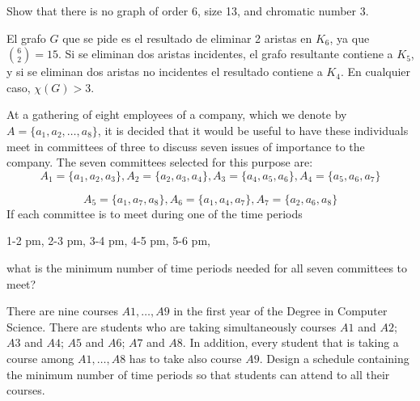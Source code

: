 \documentclass[twoside]{article}
\begin{document}
\newpage

\begin{ejercicio}{3.3}
 Show that there is no graph of order 6, size 13, and chromatic number 3.
\end{ejercicio}
\begin{solucion}
El grafo $G$ que se pide es el resultado de eliminar 2 aristas en $K_6$, ya que $\binom{6}{2}=15$. Si se eliminan dos aristas incidentes, el grafo resultante contiene a $K_5$, y si se eliminan dos aristas no incidentes el resultado contiene a $K_4$. En cualquier caso, $\chi(G)>3$. 
\end{solucion}

\newpage

\begin{ejercicio}{3.4}

At a gathering of eight employees of a company, which we denote by $A = \{a_1, a_2, \dots , a_8\}$,
it is decided that it would be useful to have these individuals meet in committees of three
to discuss seven issues of importance to the company. The seven committees selected
for this purpose are:
$$A_1 = \{a_1, a_2, a_3\}, A_2 = \{a_2, a_3, a_4\}, A_3 = \{a_4, a_5, a_6\}, A_4 = \{a_5, a_6, a_7\}$$

$$A_5 = \{a_1, a_7, a_8\}, A_6 = \{a_1, a_4, a_7\}, A_7 = \{a_2, a_6, a_8\}$$
If each committee is to meet during one of the time periods

1-2 pm, 2-3 pm, 3-4 pm, 4-5 pm, 5-6 pm,

what is the minimum number of time periods needed for all seven committees to meet?

\end{ejercicio}
\begin{solucion}



\end{solucion}

\newpage

\begin{ejercicio}{3.5}

There are nine courses $A1,\dots, A9$ in the first year of the Degree in Computer Science.
There are students who are taking simultaneously courses $A1$ and $A2$; $A3$ and $A4$; $A5$
and $A6$; $A7$ and $A8$. In addition, every student that is taking a course among $A1,\dots, A8$
has to take also course $A9$. Design a schedule containing the minimum number of time
periods so that students can attend to all their courses.

\end{ejercicio}
\begin{solucion}
 
 
\end{solucion}
\end{document}
